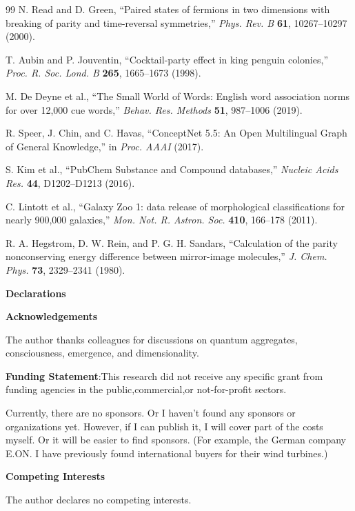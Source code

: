 \documentclass[11pt,a4paper]{article}
\begin{document}
\begin{thebibliography}{99}
N. Read and D. Green,
``Paired states of fermions in two dimensions with breaking of parity and time-reversal symmetries,''
\textit{Phys. Rev. B} \textbf{61}, 10267--10297 (2000).

T. Aubin and P. Jouventin,
``Cocktail-party effect in king penguin colonies,''
\textit{Proc. R. Soc. Lond. B} \textbf{265}, 1665--1673 (1998).

M. De Deyne et al.,
``The Small World of Words: English word association norms for over 12,000 cue words,''
\textit{Behav. Res. Methods} \textbf{51}, 987--1006 (2019).

R. Speer, J. Chin, and C. Havas,
``ConceptNet 5.5: An Open Multilingual Graph of General Knowledge,''
in \textit{Proc. AAAI} (2017).

S. Kim et al.,
``PubChem Substance and Compound databases,''
\textit{Nucleic Acids Res.} \textbf{44}, D1202--D1213 (2016).

C. Lintott et al.,
``Galaxy Zoo 1: data release of morphological classifications for nearly 900,000 galaxies,''
\textit{Mon. Not. R. Astron. Soc.} \textbf{410}, 166--178 (2011).

R. A. Hegstrom, D. W. Rein, and P. G. H. Sandars,
``Calculation of the parity nonconserving energy difference between mirror-image molecules,''
\textit{J. Chem. Phys.} \textbf{73}, 2329--2341 (1980).

\end{thebibliography}
\textbf{\textbf{Declarations}}

  
  
  \textbf{\textbf{Acknowledgements}}

The author thanks colleagues for discussions on quantum aggregates, consciousness, emergence, and dimensionality. 

 \textbf{\textbf{Funding Statement}}:This research did not receive any specific grant from funding agencies in the public,commercial,or not-for-profit sectors.

Currently, there are no sponsors. Or I haven't found any sponsors or organizations yet. However, if I can publish it, I will cover part of the costs myself. Or it will be easier to find sponsors. (For example, the German company E.ON. I have previously found international buyers for their wind turbines.)

 \textbf{\textbf{Competing Interests}}

The author declares no competing interests.
\end{document}
